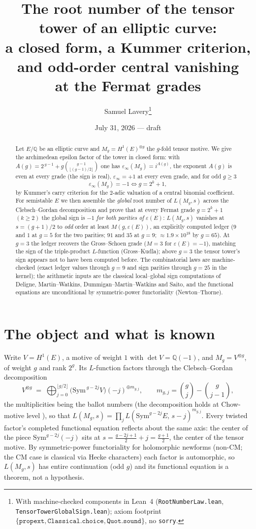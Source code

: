 \documentclass[11pt]{article}
\title{The root number of the tensor tower of an elliptic curve:\\
a closed form, a Kummer criterion, and odd-order central vanishing\\
at the Fermat grades}
\author{Samuel Lavery\thanks{With machine-checked components in Lean~4
(\texttt{RootNumberLaw.lean}, \texttt{TensorTowerGlobalSign.lean}); axiom footprint
$\{\texttt{propext},\texttt{Classical.choice},\texttt{Quot.sound}\}$, no \texttt{sorry}.}}
\date{July 31, 2026 --- draft}
\newcommand{\Sym}{\mathrm{Sym}}
\newcommand{\eps}{\varepsilon}
\begin{document}
\maketitle

\begin{abstract}
Let $E/\mathbb Q$ be an elliptic curve and $M_g=H^1(E)^{\otimes g}$ the $g$-fold tensor
motive.  We give the archimedean epsilon factor of the tower in closed form: with
$A(g)=2^{\,g-1}+g\binom{g-1}{\lfloor (g-1)/2\rfloor}$ one has
$\eps_\infty(M_g)=i^{A(g)}$, the exponent $A(g)$ is even at every grade (the sign is
real), $\eps_\infty=+1$ at every even grade, and for odd $g\ge3$
\[
\eps_\infty(M_g)=-1 \iff g=2^k+1 ,
\]
by Kummer's carry criterion for the $2$-adic valuation of a central binomial
coefficient.  For semistable $E$ we then assemble the \emph{global} root number of
$L(M_g,s)$ across the Clebsch--Gordan decomposition and prove that at every Fermat
grade $g=2^k+1$ $(k\ge2)$ the global sign is $-1$ \emph{for both parities of}
$\eps(E)$: $L(M_g,s)$ vanishes at $s=(g+1)/2$ to \emph{odd} order at least
$M(g,\eps(E))$, an explicitly computed ledger ($9$ and $1$ at $g=5$ for the two
parities; $91$ and $35$ at $g=9$; $\approx1.9\times10^{18}$ by $g=65$).  At $g=3$
the ledger recovers the Gross--Schoen grade ($M=3$ for $\eps(E)=-1$), matching the
sign of the triple-product $L$-function (Gross--Kudla); above $g=3$ the tensor
tower's sign appears not to have been computed before.  The combinatorial laws are
machine-checked (exact ledger values through $g=9$ and sign parities through
$g=25$ in the kernel); the arithmetic inputs are the classical local--global sign
computations of Deligne, Martin--Watkins, Dummigan--Martin--Watkins and Saito, and
the functional equations are unconditional by symmetric-power functoriality
(Newton--Thorne).
\end{abstract}

\section{The object and what is known}

Write $V=H^1(E)$, a motive of weight $1$ with $\det V=\mathbb Q(-1)$, and
$M_g=V^{\otimes g}$, of weight $g$ and rank $2^g$.  Its $L$-function factors through
the Clebsch--Gordan decomposition
\begin{equation}\label{eq:cg}
V^{\otimes g}\;=\;\bigoplus_{j=0}^{\lfloor g/2\rfloor}
\bigl(\Sym^{\,g-2j}V\bigr)(-j)^{\oplus m_{g,j}},\qquad
m_{g,j}=\binom gj-\binom g{j-1},
\end{equation}
the multiplicities being the ballot numbers (the decomposition holds at
Chow-motive level \cite{Cao}), so that
$L(M_g,s)=\prod_j L(\Sym^{g-2j}E,\,s-j)^{m_{g,j}}$.  Every twisted factor's completed
functional equation reflects about the same axis: the center of the piece
$\Sym^{g-2j}(-j)$ sits at $s=\frac{g-2j+1}2+j=\frac{g+1}2$, the center of the tensor
motive.  By symmetric-power functoriality for holomorphic newforms
\cite{NewtonThorne} (non-CM; the CM case is classical via Hecke characters) each
factor is automorphic, so $L(M_g,s)$ has entire continuation (odd $g$) and its
functional equation is a theorem, not a hypothesis.
\end{document}
